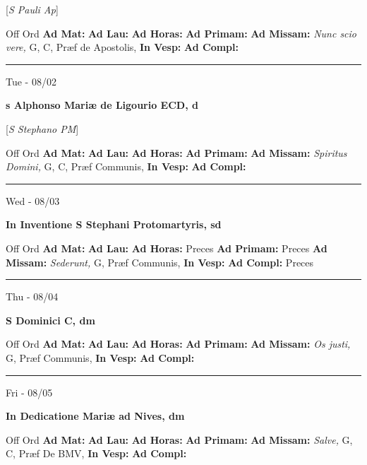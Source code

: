 \documentclass[letterpaper, 10pt]{article}
\begin{document}
[\textit{S Pauli Ap}]
\begin{justify}
Off Ord
\textbf{Ad Mat: }
\textbf{Ad Lau: }
\textbf{Ad Horas: }
\textbf{Ad Primam: }
\textbf{Ad Missam:} \textit{Nunc scio vere, } G, C, Præf de Apostolis, 
\textbf{In Vesp: }
\textbf{Ad Compl: }\end{justify}



\hrule
\begin{center}
Tue - 08/02
\end{center}\textbf{ \large s Alphonso Mariæ de Ligourio ECD, \textnormal{\normalsize d}}

[\textit{S Stephano PM}]
\begin{justify}
Off Ord
\textbf{Ad Mat: }
\textbf{Ad Lau: }
\textbf{Ad Horas: }
\textbf{Ad Primam: }
\textbf{Ad Missam:} \textit{Spiritus Domini, } G, C, Præf Communis, 
\textbf{In Vesp: }
\textbf{Ad Compl: }\end{justify}



\hrule
\begin{center}
Wed - 08/03
\end{center}\textbf{ \large In Inventione S Stephani Protomartyris, \textnormal{\normalsize sd}}
\begin{justify}
Off Ord
\textbf{Ad Mat: }
\textbf{Ad Lau: }
\textbf{Ad Horas: }Preces
\textbf{Ad Primam: }Preces
\textbf{Ad Missam:} \textit{Sederunt, } G, Præf Communis, 
\textbf{In Vesp: }
\textbf{Ad Compl: }Preces\end{justify}



\hrule
\begin{center}
Thu - 08/04
\end{center}\textbf{ \large S Dominici C, \textnormal{\normalsize dm}}
\begin{justify}
Off Ord
\textbf{Ad Mat: }
\textbf{Ad Lau: }
\textbf{Ad Horas: }
\textbf{Ad Primam: }
\textbf{Ad Missam:} \textit{Os justi, } G, Præf Communis, 
\textbf{In Vesp: }
\textbf{Ad Compl: }\end{justify}



\hrule
\begin{center}
Fri - 08/05
\end{center}\textbf{ \large In Dedicatione Mariæ ad Nives, \textnormal{\normalsize dm}}
\begin{justify}
Off Ord
\textbf{Ad Mat: }
\textbf{Ad Lau: }
\textbf{Ad Horas: }
\textbf{Ad Primam: }
\textbf{Ad Missam:} \textit{Salve, } G, C, Præf De BMV, 
\textbf{In Vesp: }
\textbf{Ad Compl: }\end{justify}
\end{document}
